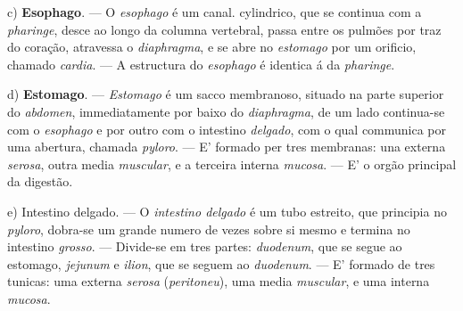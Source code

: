 c) \textbf{Esophago}. --- O \emph{esophago} é um canal. cylindrico, que se continua com a \emph{pharinge}, desce ao longo da columna vertebral, passa entre os pulmões por traz do coração, atravessa o \emph{diaphragma}, e se abre no \emph{estomago} por um orificio, chamado \emph{cardia}. --- A estructura do \emph{esophago} é identica á da \emph{pharinge}.

d) \textbf{Estomago}. --- \emph{Estomago} é um sacco membranoso, situado na parte superior do \emph{abdomen}, immediatamente por baixo do \emph{diaphragma}, de um lado continua-se com o \emph{esophago} e por outro com o intestino \emph{delgado}, com o qual communica   por uma abertura, chamada \emph{pyloro}. --- E' formado per tres membranas: una externa \emph{serosa}, outra media \emph{muscular}, e a terceira interna \emph{mucosa}. --- E' o orgão principal da digestão.

e) Intestino delgado. --- O \emph{intestino delgado} é um tubo estreito, que principia no \emph{pyloro}, dobra-se um grande numero de vezes sobre si mesmo e termina no intestino \emph{grosso}. --- Divide-se em tres partes: \emph{duodenum}, que se segue ao estomago, \emph{jejunum} e \emph{ilion}, que se seguem ao \emph{duodenum}. --- E' formado de tres tunicas: uma externa \emph{serosa} (\emph{peritoneu}), uma media \emph{muscular}, e uma interna \emph{mucosa}.

